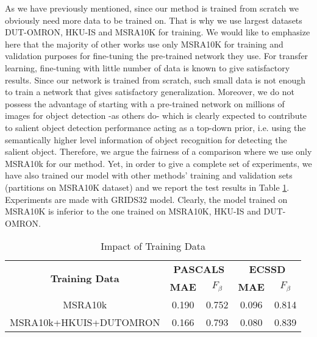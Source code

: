 \documentclass[a4paper,conference]{IEEEtran}
\begin{document}
As we have previously mentioned, since our method is trained from scratch we obviously need more data to be trained on. That is why we use largest datasets DUT-OMRON, HKU-IS and MSRA10K for training.
We would like to emphasize here that the majority of other works use only MSRA10K for training and validation purposes for fine-tuning the pre-trained network they use. 
For transfer learning, fine-tuning with little number of data is known to give satisfactory results. 
Since our network is trained from scratch, such small data is not enough to train a network that gives satisfactory generalization.
Moreover, we do not possess the advantage of starting with a pre-trained network on millions of images for object detection -as others do- which is clearly expected to contribute to salient object detection performance acting as a top-down prior, i.e. using the semantically higher level information of object recognition for detecting the salient object.
Therefore, we argue the fairness of a comparison where we use only MSRA10k for our method.
Yet, in order to give a complete set of experiments, we have also trained our model with other methods' training and validation sets (partitions on MSRA10K dataset) and we report the test results in Table \ref{table6}.
Experiments are made with GRIDS32 model.
Clearly, the model trained on MSRA10K is inferior to the one trained on MSRA10K, HKU-IS and DUT-OMRON.

\begin{table}[!t]
\renewcommand{\arraystretch}{1.3}
\caption{Impact of Training Data}
\label{table6}
\centering
\begin{tabular}{|c||c||c||c||c|}
\hline
    \multirow{2}{2cm}{\textbf{Training Data}} & \multicolumn{2}{c|}{\textbf{PASCALS}} & \multicolumn{2}{c|}{\textbf{ECSSD}}   \\
    \cline{2-5}
     &\textbf{MAE} & \textbf{$F_\beta$} & \textbf{MAE} & \textbf{$F_\beta$}   \\
    \hline

    MSRA10k & 0.190 & 0.752 & 0.096 & 0.814 \\ \hline
    MSRA10k+HKUIS+DUTOMRON & 0.166 & 0.793 & 0.080 & 0.839   \\ \hline    

\end{tabular}
\end{table}
\end{document}
